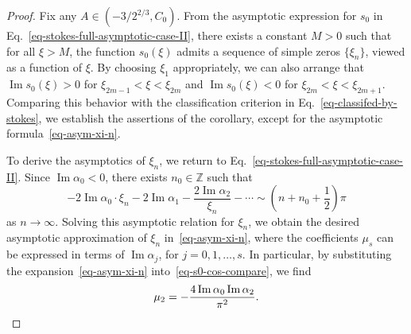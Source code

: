 \documentclass[10pt,a4paper]{amsart}
\renewcommand\Im{\operatorname{Im}}
\begin{document}
\begin{proof}
Fix any \( A \in (-3/2^{2/3}, C_{0}) \). From the asymptotic expression for \( s_{0} \) in Eq.~\eqref{eq-stokes-full-asymptotic-case-II}, there exists a constant \( M > 0 \) such that for all \( \xi > M \), the function \( s_{0}(\xi) \) admits a sequence of simple zeros \( \{ \xi_n \} \), viewed as a function of \( \xi \). By choosing \( \xi_1 \) appropriately, we can also arrange that \( \Im s_{0}(\xi) > 0 \) for \( \xi_{2m-1} < \xi < \xi_{2m} \) and \( \Im s_{0}(\xi) < 0 \) for \( \xi_{2m} < \xi < \xi_{2m+1} \). Comparing this behavior with the classification criterion in Eq.~\eqref{eq-classifed-by-stokes}, we establish the assertions of the corollary, except for the asymptotic formula~\eqref{eq-asym-xi-n}.


To derive the asymptotics of \( \xi_n \), we return to Eq.~\eqref{eq-stokes-full-asymptotic-case-II}. Since \( \Im \alpha_{0} < 0 \), there exists \( n_{0} \in \mathbb{Z} \) such that
\begin{equation}\label{eq-s0-cos-compare}
-2\Im \alpha_{0}\cdot\xi_{n}-2\Im \alpha_{1}-\frac{2\Im \alpha_{2}}{\xi_{n}}-\cdots\sim \left(n+n_{0}+\frac{1}{2}\right)\pi
\end{equation}
as \( n \to \infty \). Solving this asymptotic relation for \( \xi_n \), we obtain
the desired asymptotic approximation of $\xi_n$ in~\eqref{eq-asym-xi-n},
where the coefficients \( \mu_s \) can be expressed in terms of \( \Im \alpha_{j} \), for \( j = 0, 1, \ldots, s \). In particular, by substituting the expansion~\eqref{eq-asym-xi-n} into~\eqref{eq-s0-cos-compare}, we find
\[
\mu_{2}=-\frac{4\Im\alpha_{0}\Im\alpha_{2}}{\pi^2}. \qedhere
\]
\end{proof}
\end{document}
